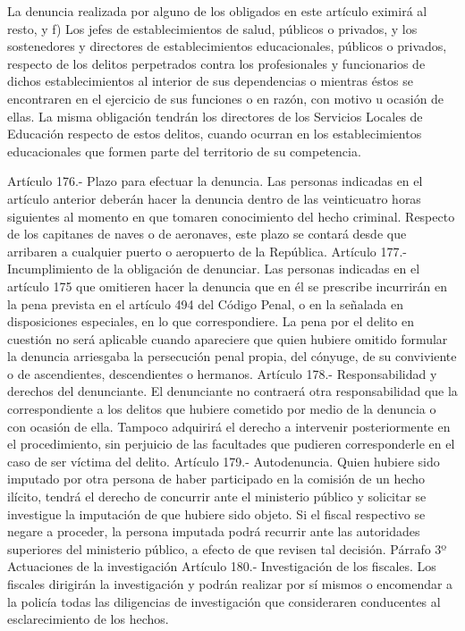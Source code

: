     La denuncia realizada por alguno de los obligados en este artículo eximirá al resto, y
    f) Los jefes de establecimientos de salud, públicos o privados, y los sostenedores y directores de establecimientos educacionales, públicos o privados, respecto de los delitos perpetrados contra los profesionales y funcionarios de dichos establecimientos al interior de sus dependencias o mientras éstos se encontraren en el ejercicio de sus funciones o en razón, con motivo u ocasión de ellas. La misma obligación tendrán los directores de los Servicios Locales de Educación respecto de estos delitos, cuando ocurran en los establecimientos educacionales que formen parte del territorio de su competencia.

    Artículo 176.- Plazo para efectuar la denuncia. Las personas indicadas en el artículo anterior deberán hacer la denuncia dentro de las veinticuatro horas siguientes al momento en que tomaren conocimiento del hecho criminal. Respecto de los capitanes de naves o de aeronaves, este plazo se contará desde que arribaren a cualquier puerto o aeropuerto de la República.
    Artículo 177.- Incumplimiento de la obligación de denunciar. Las personas indicadas en el artículo 175 que omitieren hacer la denuncia que en él se prescribe incurrirán en la pena prevista en el artículo 494 del Código Penal, o en la señalada en disposiciones especiales, en lo que correspondiere.
    La pena por el delito en cuestión no será aplicable cuando apareciere que quien hubiere omitido formular la denuncia arriesgaba la persecución penal propia, del cónyuge, de su conviviente o de ascendientes, descendientes o hermanos.
    Artículo 178.- Responsabilidad y derechos del denunciante. El denunciante no contraerá otra responsabilidad que la correspondiente a los delitos que hubiere cometido por medio de la denuncia o con ocasión de ella. Tampoco adquirirá el derecho a intervenir posteriormente en el procedimiento, sin perjuicio de las facultades que pudieren corresponderle en el caso de ser víctima del delito.
    Artículo 179.- Autodenuncia. Quien hubiere sido imputado por otra persona de haber participado en la comisión de un hecho ilícito, tendrá el derecho de concurrir ante el ministerio público y solicitar se investigue la imputación de que hubiere sido objeto.
    Si el fiscal respectivo se negare a proceder, la persona imputada podrá recurrir ante las autoridades superiores del ministerio público, a efecto de que revisen tal decisión.
    Párrafo 3º Actuaciones de la investigación
    Artículo 180.- Investigación de los fiscales. Los fiscales dirigirán la investigación y podrán realizar por sí mismos o encomendar a la policía todas las diligencias de investigación que consideraren conducentes al esclarecimiento de los hechos.
